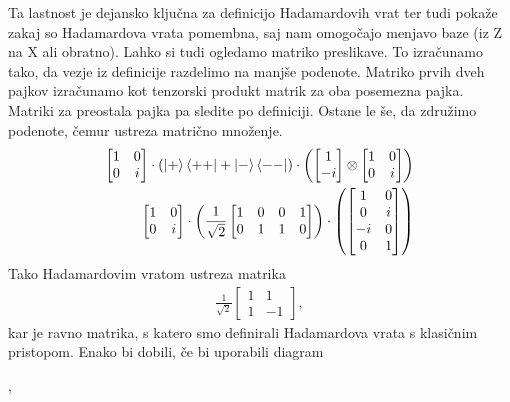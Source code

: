 \documentclass[mat1]{fmfdelo}
\begin{document}
Ta lastnost je dejansko ključna za definicijo Hadamardovih vrat ter tudi pokaže zakaj so Hadamardova vrata pomembna, saj nam omogočajo menjavo baze (iz Z na X ali obratno). Lahko si tudi ogledamo matriko preslikave. To izračunamo tako, da vezje iz definicije razdelimo na manjše podenote. Matriko prvih dveh pajkov izračunamo kot tenzorski produkt matrik za oba posemezna pajka. Matriki za preostala pajka pa sledite po definiciji. Ostane le še, da združimo podenote, čemur ustreza matrično množenje.
\begin{align*}
    \begin{bmatrix}
        1&0\\0&i
    \end{bmatrix}\cdot \left(\ket{+}\bra{++}+\ket{-}\bra{--}\right)\cdot \left(\begin{bmatrix}
        1\\-i
    \end{bmatrix}\otimes\begin{bmatrix}
        1&0\\0&i
    \end{bmatrix}\right) \\
    \begin{bmatrix}
        1&0\\0&i
    \end{bmatrix}\cdot\left( \frac{1}{\sqrt2}\begin{bmatrix}
        1&0&0&1\\
        0&1&1&0
    \end{bmatrix}\right) \cdot
    \left(\begin{bmatrix}
        1 &0\\
        0 &i\\
        -i&0\\
        0 &1
    \end{bmatrix}
    \right)
\end{align*}
Tako Hadamardovim vratom ustreza matrika
\begin{align*}
    \frac{1}{\sqrt2}\begin{bmatrix}
        1&1\\
        1&-1
    \end{bmatrix},
\end{align*}
kar je ravno matrika, s katero smo definirali Hadamardova vrata s klasičnim pristopom. Enako bi dobili, če bi uporabili diagram 
\begin{center}
    ,
\end{center}
\end{document}
